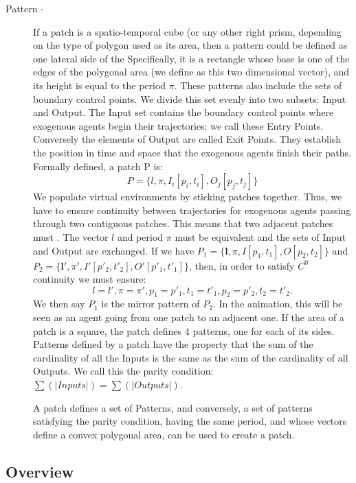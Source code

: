 \begin{description}

\item[Pattern -]{If a patch is a spatio-temporal cube (or any other right prism, depending on the type of polygon used as its area, then a pattern could be defined as one lateral side of the  Specifically, it is a rectangle whose base is one of the edges of the polygonal area (we define  as this two dimensional vector), and its height is equal to the period $\pi$. These patterns also include the sets of boundary control points. We divide this set evenly into two subsets: Input and Output. The Input set contains the boundary control points where exogenous agents begin their trajectories; we call these Entry Points. Conversely the elements of Output are called Exit Points. They establish the position in time and space that the exogenous agents finish their paths. Formally defined, a patch P is:
$$ P = \{l, \pi, I_i [p_i, t_i], O_j[p_j, t_j]\}$$
We populate virtual environments by sticking patches together. Thus, we have to ensure continuity between trajectories for exogenous agents passing through two contiguous patches. This means that two adjacent patches must . The vector $l$ and period $\pi$ must be equivalent and the sets of Input and Output are exchanged. If we have $P_1=\{\mathbf{l}, \pi, I [p_1,t_1], O[p_2,t_2]\}$ and $P_2=\{\mathbf{l'}, \pi', I'[p'_2, t'_2], O'[p'_1, t'_1]\}$, then, in order to satisfy $C^0$ continuity we must ensure: 
$$ l=l', \pi=\pi', p_1=p'_1, t_1=t'_1, p_2=p'_2, t_2=t'_2.$$
We then say $P_1$ is the mirror pattern of $P_2$. In the animation, this will be seen as an agent going from one patch to an adjacent one. 
If the area of a patch is a square, the patch defines 4 patterns, one for each of its sides. Patterns defined by a patch have the property that the sum of the cardinality of all the Inputs is the same as the sum of the cardinality of all Outputs. We call this the parity condition: $\sum(|Inputs|)= \sum(|Outputs|)$.

A patch defines a set of Patterns, and conversely, a set of patterns satisfying the parity condition, having the same period, and whose vectors define a convex polygonal area, can be used to create a patch. 
 }

\end{description}

\subsection{Overview}
\label{sec:method:overview}

